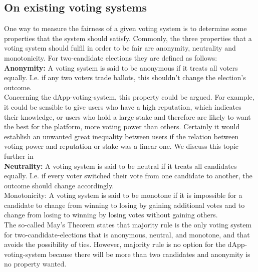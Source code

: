 
\subsection{On existing voting systems}


One way to measure the fairness of a given voting system is to determine some properties that the system should satisfy. 
Commonly, the three properties that a voting system should fulfil in order to be fair are anonymity, neutrality and monotonicity. For two-candidate elections they are defined as follows: \\
{\bf{Anonymity:}} A voting system is said to be anonymous if it treats all voters equally. I.e. if any two voters trade ballots, this shouldn't change the election's outcome. \\
Concerning the dApp-voting-system, this property could be argued. For example, it could be sensible to give users who have a high reputation, which indicates their knowledge, or users who hold a large stake and therefore are likely to want the best for the platform, more voting power than others. Certainly it would establish an unwanted great inequality between users if the relation between voting power and reputation or stake was a linear one. We discuss this topic further in \\%
{\bf{Neutrality:}} A voting system is said to be neutral if it treats all candidates equally. I.e. if every voter switched their vote from one candidate to another, the outcome should change accordingly. \\
Monotonicity: A voting system is said to be monotone if it is impossible for a candidate to change from winning to losing by gaining additional votes and to change from losing to winning by losing votes without gaining others. \\
The so-called May's Theorem states that majority rule %
is the only voting system for two-candidate-elections that is anonymous, neutral, and monotone, and that avoids the possibility of ties. However, majority rule is no option for the dApp-voting-system because there will be more than two candidates and anonymity is no property wanted. \\

